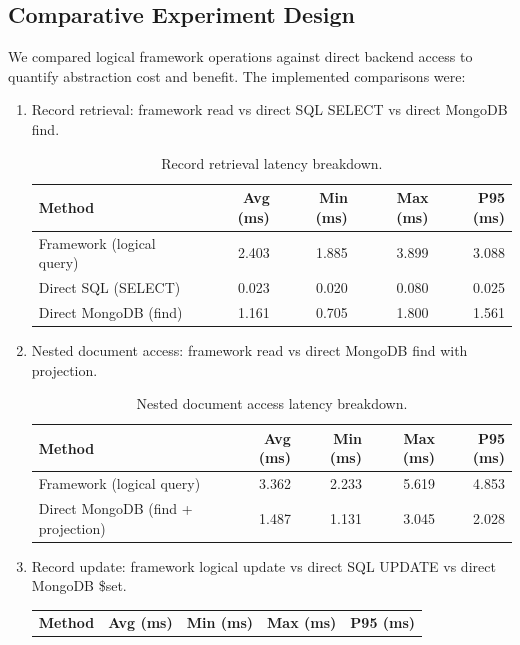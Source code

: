 \documentclass[12pt,a4paper]{article}
\begin{document}
\subsection{Comparative Experiment Design}
We compared logical framework operations against direct backend access to quantify abstraction cost and benefit. The implemented comparisons were:
\begin{enumerate}
	\item Record retrieval: framework read vs direct SQL SELECT vs direct MongoDB find.
	\begin{table}[H]
    \centering
    \begin{tabular}{l r r r r}
    \toprule
    \textbf{Method} & \textbf{Avg (ms)} & \textbf{Min (ms)} & \textbf{Max (ms)} & \textbf{P95 (ms)} \\
    \midrule
    Framework (logical query) & 2.403 & 1.885 & 3.899 & 3.088 \\
    Direct SQL (SELECT) & 0.023 & 0.020 & 0.080 & 0.025 \\
    Direct MongoDB (find) & 1.161 & 0.705 & 1.800 & 1.561 \\
    \bottomrule
    \end{tabular}
    \caption{Record retrieval latency breakdown.}
    \end{table}
	\item Nested document access: framework read vs direct MongoDB find with projection.
	\begin{table}[H]
        \centering
        \begin{tabular}{l r r r r}
        \toprule
        \textbf{Method} & \textbf{Avg (ms)} & \textbf{Min (ms)} & \textbf{Max (ms)} & \textbf{P95 (ms)} \\
        \midrule
        Framework (logical query) & 3.362 & 2.233 & 5.619 & 4.853 \\
        Direct MongoDB (find + projection) & 1.487 & 1.131 & 3.045 & 2.028 \\
        \bottomrule
        \end{tabular}
        \caption{Nested document access latency breakdown.}
        \end{table}
	\item Record update: framework logical update vs direct SQL UPDATE vs direct MongoDB \$set.
	\begin{table}[H]
    \centering
    \begin{tabular}{l r r r r}
    \toprule
    \textbf{Method} & \textbf{Avg (ms)} & \textbf{Min (ms)} & \textbf{Max (ms)} & \textbf{P95 (ms)} \\

\end{tabular}
\end{table}
\end{enumerate}
\end{document}
